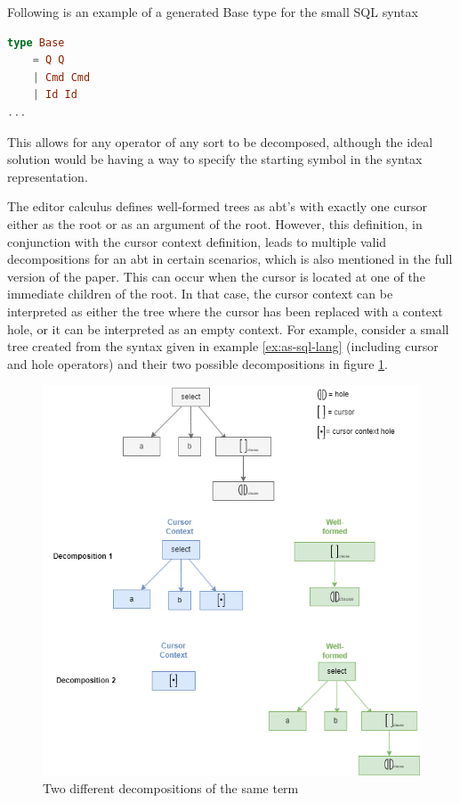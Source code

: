 \documentclass[sigplan,review]{acmart}
\newcommand{\abt}{\textsf{abt}\xspace}
\begin{document}
\begin{example}\label{ex:c-spec}
Following is an example of a generated Base type for the small SQL syntax
  \begin{lstlisting}[language=elm,style=examplestyle]
type Base
    = Q Q
    | Cmd Cmd
    | Id Id
...
\end{lstlisting}
\end{example}

This allows for any operator
of any sort to be decomposed, although the ideal solution would be having
a way to specify the starting symbol in the syntax representation.

The editor calculus defines well-formed trees as {\abt}'s
with exactly one cursor either as the root or as an argument of the root.
However, this definition, in conjunction with the cursor context definition,
leads to multiple valid decompositions for an \abt in certain scenarios,
which is also mentioned in the full version of the paper. This can occur when the cursor is located
at one of the immediate children of the root. In that case, the cursor context
can be interpreted as either the tree where the cursor has been replaced with a
context hole, or it can be interpreted as an empty context.
For example, consider a small tree created from the syntax given in
example \cref{ex:as-sql-lang} (including cursor and hole operators) and
their two possible decompositions in figure \cref{fig:sql-decomp-ex}.


\begin{figure}[H]
  \centering
  \includegraphics[width=\linewidth]{img/slq-decompose-ex.drawio.png}
  \caption{Two different decompositions of the same term}
  \label{fig:sql-decomp-ex}
\end{figure}
\end{document}

